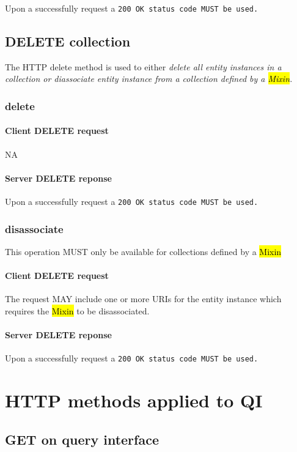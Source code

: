 \documentclass[10pt,a4paper]{article}
\begin{document}
Upon a successfully request a \tt{200 OK} status code MUST be used.

\subsection{DELETE collection}
The HTTP delete method is used to either \em{delete} all entity instances in a collection or \em{diassociate} entity instance from a collection defined by a \hl{Mixin}.

\subsubsection{delete}

\paragraph{Client DELETE request}
NA

\paragraph{Server DELETE reponse}
Upon a successfully request a \tt{200 OK} status code MUST be used.

\subsubsection{disassociate}
This operation MUST only be available for collections defined by a \hl{Mixin}

\paragraph{Client DELETE request}
The request MAY include one or more URIs for the entity instance which requires the \hl{Mixin} to be disassociated.

\paragraph{Server DELETE reponse}
Upon a successfully request a \tt{200 OK} status code MUST be used.

\section{HTTP methods applied to QI}

\subsection{GET on query interface}
\end{document}

